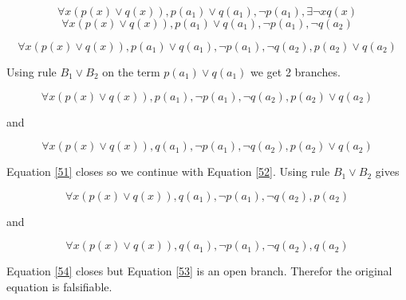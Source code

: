 \documentclass[10pt,a4paper]{article}
\begin{document}
 \begin{equation}
 \forall x (p(x) \vee q(x)),p(a_1)\vee q(a_1) ,\neg p(a_1), \exists \neg x q(x)
\end{equation}
 \begin{equation}
 \forall x (p(x) \vee q(x)),p(a_1)\vee q(a_1) ,\neg p(a_1),  \neg q(a_2)
\end{equation}

 \begin{equation}
 \forall x (p(x) \vee q(x)),p(a_1)\vee q(a_1) ,\neg p(a_1),  \neg q(a_2), p(a_2)\vee q(a_2)
\end{equation}

 Using rule $B_1 \vee B_2$ on the term $p(a_1)\vee q(a_1)$ we get 2 branches.
 
  \begin{equation}
  \label{51}
 \forall x (p(x) \vee q(x)),p(a_1) ,\neg p(a_1),  \neg q(a_2), p(a_2)\vee q(a_2)
\end{equation}

and 

 \begin{equation}
 \label{52}
 \forall x (p(x) \vee q(x)), q(a_1) ,\neg p(a_1),  \neg q(a_2), p(a_2)\vee q(a_2)
\end{equation}
 
Equation \ref{51} closes so we continue with Equation \ref{52}. Using rule $B_1 \vee B_2$ gives 

 \begin{equation}
 \label{53}
 \forall x (p(x) \vee q(x)), q(a_1) ,\neg p(a_1),  \neg q(a_2), p(a_2)
\end{equation} 

and

\begin{equation}
 \label{54}
 \forall x (p(x) \vee q(x)), q(a_1) ,\neg p(a_1),  \neg q(a_2), q(a_2)
\end{equation}

Equation \ref{54} closes but Equation \ref{53} is an open branch. Therefor the original equation is falsifiable.

 
\end{document}
